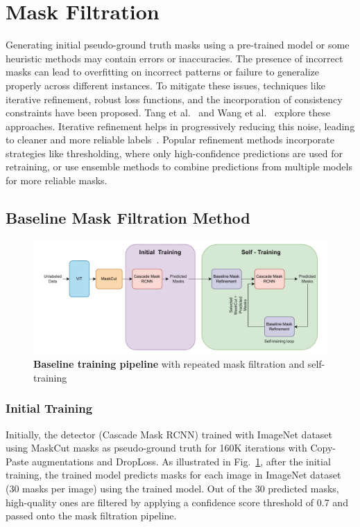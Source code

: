 \section{Mask Filtration}
\label{section:Mask-Filtration}
Generating initial pseudo-ground truth masks using a pre-trained model or some heuristic methods may contain errors or inaccuracies. The presence of incorrect masks can lead to overfitting on incorrect patterns or failure to generalize properly across different instances. To mitigate these issues, techniques like iterative refinement, robust loss functions, and the incorporation of consistency constraints have been proposed. Tang et al.~\cite{Tang_2018_CVPR} and Wang et al.~\cite{ziegler2022selfsupervisedlearningobjectparts} explore these approaches. Iterative refinement helps in progressively reducing this noise, leading to cleaner and more reliable labels~\cite{xie2020selftrainingnoisystudentimproves}. Popular refinement methods incorporate strategies like thresholding, where only high-confidence predictions are used for retraining, or use ensemble methods to combine predictions from multiple models for more reliable masks.

\subsection{Baseline Mask Filtration Method}
\label{sec:baseline_mask_filteration}

\begin{figure}
	\centering
	\includegraphics[width=1\textwidth]{Images/main/baseline_approach.pdf}
	\caption[\textbf{Baseline Training Pipeline}]{\textbf{Baseline training pipeline} with repeated mask filtration and self-training}
	\label{fig:baseline_training}
\end{figure}

\subsubsection{Initial Training}
Initially, the detector (Cascade Mask RCNN) trained with  ImageNet dataset using MaskCut masks as pseudo-ground truth for 160K iterations with Copy-Paste augmentations and DropLoss. As illustrated in Fig.~\ref{fig:baseline_training}, after the initial training, the trained model predicts masks for each image in ImageNet dataset (30 masks per image) using the trained model. Out of the 30 predicted masks, high-quality ones are filtered by applying a confidence score threshold of 0.7 and passed onto the mask filtration pipeline. 


